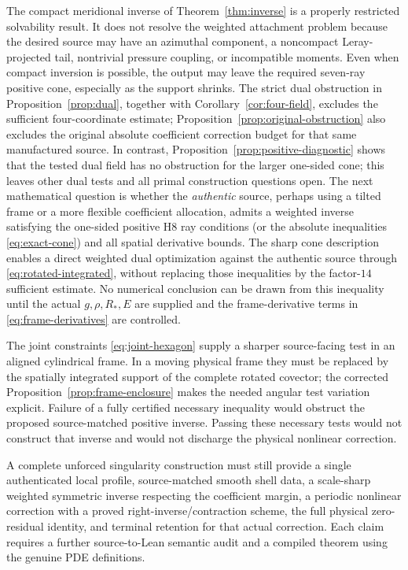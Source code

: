 \documentclass[11pt,a4paper]{article}
\theoremstyle{plain}
\theoremstyle{definition}
\begin{document}
The compact meridional inverse of Theorem~\ref{thm:inverse} is a
properly restricted solvability result. It does not resolve the
weighted attachment problem because the desired source may have an
azimuthal component, a noncompact Leray-projected tail, nontrivial
pressure coupling, or incompatible moments. Even when compact
inversion is possible, the output may leave the required seven-ray
positive cone, especially as the support shrinks. The strict dual
obstruction in Proposition~\ref{prop:dual}, together with
Corollary~\ref{cor:four-field}, excludes the sufficient
four-coordinate estimate; Proposition~\ref{prop:original-obstruction}
also excludes the original absolute coefficient correction budget
for that same manufactured source. In contrast,
Proposition~\ref{prop:positive-diagnostic} shows that the tested
dual field has no obstruction for the larger one-sided cone; this
leaves other dual tests and all primal construction questions open.
The next mathematical question is whether the \emph{authentic}
source, perhaps using a tilted frame or a more flexible coefficient
allocation, admits a weighted inverse satisfying the one-sided
positive H8 ray conditions (or the absolute inequalities
\eqref{eq:exact-cone}) and all spatial
derivative bounds. The sharp cone description enables a direct
weighted dual optimization against the authentic source through
\eqref{eq:rotated-integrated}, without
replacing those inequalities by the factor-$14$ sufficient estimate.
No numerical conclusion can be drawn from this inequality until the
actual $g,\rho,R_*,E$ are supplied and the frame-derivative terms
in \eqref{eq:frame-derivatives} are controlled.

The joint constraints \eqref{eq:joint-hexagon} supply a sharper
source-facing test in an aligned cylindrical frame. In a moving
physical frame they must be replaced by the spatially integrated
support of the complete rotated covector; the corrected
Proposition~\ref{prop:frame-enclosure} makes the needed angular
test variation explicit. Failure of a fully certified necessary
inequality would obstruct the proposed source-matched positive
inverse. Passing these necessary tests would not construct that
inverse and would not discharge the physical nonlinear correction.

A complete unforced singularity construction must still provide a
single authenticated local profile, source-matched smooth shell
data, a scale-sharp weighted symmetric inverse respecting the
coefficient margin, a periodic nonlinear correction
with a proved right-inverse/contraction scheme, the full physical
zero-residual identity, and terminal retention for that actual
correction. Each claim requires a further source-to-Lean semantic
audit and a compiled theorem using the genuine PDE definitions.
\end{document}
